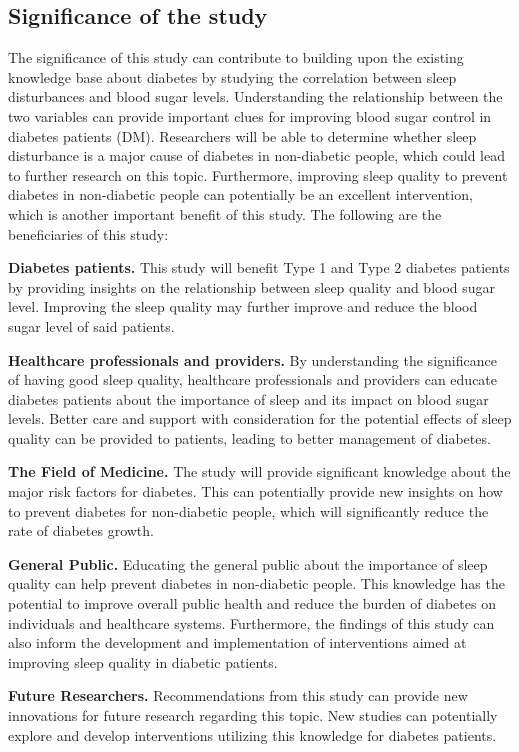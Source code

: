 \subsection*{Significance of the study}
The significance of this study can contribute to building upon the existing
knowledge base about diabetes by studying the correlation between sleep
disturbances and blood sugar levels. Understanding the relationship between the
two variables can provide important clues for improving blood sugar control in
diabetes patients (DM). Researchers will be able to determine whether sleep
disturbance is a major cause of diabetes in non-diabetic people, which could
lead to further research on this topic. Furthermore, improving sleep quality to
prevent diabetes in non-diabetic people can potentially be an excellent
intervention, which is another important benefit of this study. The following
are the beneficiaries of this study:

\textbf{Diabetes patients.} This study will benefit Type 1 and Type 2 diabetes
patients by providing insights on the relationship between sleep quality and
blood sugar level. Improving the sleep quality may further improve and reduce
the blood sugar level of said patients.

\textbf{Healthcare professionals and providers.} By understanding the
significance of having good sleep quality, healthcare professionals and
providers can educate diabetes patients about the importance of sleep and its
impact on blood sugar levels. Better care and support with consideration for the
potential effects of sleep quality can be provided to patients, leading to
better management of diabetes.

\textbf{The Field of Medicine.} The study will provide significant knowledge
about the major risk factors for diabetes. This can potentially provide new
insights on how to prevent diabetes for non-diabetic people, which will
significantly reduce the rate of diabetes growth.

\textbf{General Public.} Educating the general public about the importance of
sleep quality can help prevent diabetes in non-diabetic people. This knowledge
has the potential to improve overall public health and reduce the burden of
diabetes on individuals and healthcare systems. Furthermore, the findings of
this study can also inform the development and implementation of interventions
aimed at improving sleep quality in diabetic patients.

\textbf{Future Researchers.} Recommendations from this study can provide new
innovations for future research regarding this topic. New studies can
potentially explore and develop interventions utilizing this knowledge for
diabetes patients.
